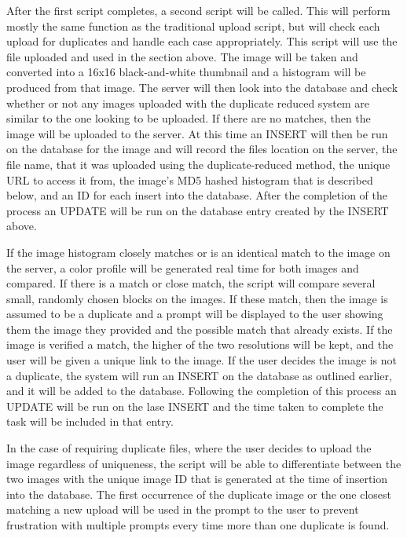 \documentclass[11pt]{article}
\begin{document}
After the first script completes, a second script will be called. This will perform mostly the same function as the traditional upload script, but will check each upload for duplicates and handle each case appropriately. This script will use the file uploaded and used in the section above. The image will be taken and converted into a 16x16 black-and-white thumbnail and a histogram will be produced from that image. The server will then look into the database and check whether or not any images uploaded with the duplicate reduced system are similar to the one looking to be uploaded. If there are no matches, then the image will be uploaded to the server. At this time an INSERT will then be run on the database for the image and will record the files location on the server, the file name, that it was uploaded using the duplicate-reduced method, the unique URL to access it from, the image's MD5 hashed histogram that is described below, and an ID for each insert into the database. After the completion of the process an UPDATE will be run on the database entry created by the INSERT above.

If the image histogram closely matches or is an identical match to the image on the server, a color profile will be generated real time for both images and compared. If there is a match or close match, the script will compare several small, randomly chosen blocks on the images. If these match, then the image is assumed to be a  duplicate and a prompt will be displayed to the user showing them the image they provided and the possible match that already exists. If the image is verified a match, the higher of the two resolutions will be kept, and the user will be given a unique link to the image. If the user decides the image is not a duplicate, the system will run an INSERT on the database as outlined earlier, and it will be added to the database. Following the completion of this process an UPDATE will be run on the lase INSERT and the time taken to complete the task will be included in that entry.

In the case of requiring duplicate files, where the user decides to upload the image regardless of uniqueness, the script will be able to differentiate between the two images with the unique image ID that is generated at the time of insertion into the database. The first occurrence of the duplicate image or the one closest matching a new upload will be used in the prompt to the user to prevent frustration with multiple prompts every time more than one duplicate is found.
\end{document}
